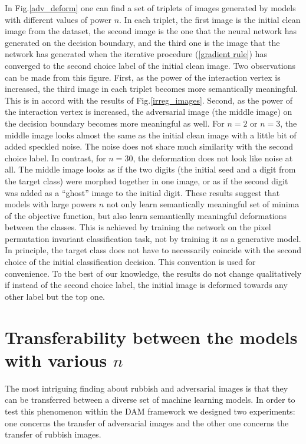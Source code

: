 In Fig.\ref{adv_deform} one can find a set of triplets of images generated by models with different values of power $n$. In each triplet, the first image is the initial clean image from the dataset, the second image is the one that the neural network has generated on the decision boundary, and the third one is the image that the network has generated when the iterative procedure (\ref{gradient rule}) has converged to the second choice label of the initial clean image. Two observations can be made from this figure. First, as the power of the interaction vertex is increased, the third image in each triplet becomes more semantically meaningful. This is in accord with the results of Fig.\ref{irreg_images}. Second, as the power of the interaction vertex is increased, the adversarial image (the middle image) on the decision boundary becomes more meaningful as well. For $n=2$ or $n=3$, the middle image looks almost the same as the initial clean image with a little bit of added speckled noise. The noise does not share much similarity with the second choice label. In contrast, for $n=30$, the deformation does not look like noise at all. The middle image looks as if the two digits (the initial seed and a digit from the target class) were morphed together in one image, or as if the second digit was added as a ``ghost'' image to the initial digit. These results suggest that models with large powers $n$ not only learn semantically meaningful set of minima of the objective function, but also learn semantically meaningful deformations between the classes. This is achieved by training the network on the pixel permutation invariant classification task, not by training it as a generative model. In principle, the target class does not have to necessarily coincide with the second choice of the initial classification decision. This convention is used for convenience. To the best of our knowledge, the results do not change qualitatively if instead of the second choice label, the initial image is deformed towards any other label but the top one.

\section{Transferability between the models with various $n$} The most intriguing finding about rubbish and adversarial images is that they can be transferred between a diverse set of machine learning models. In order to test this phenomenon within the DAM framework we designed two experiments: one concerns the transfer of adversarial images and the other one concerns the transfer of rubbish images. 

